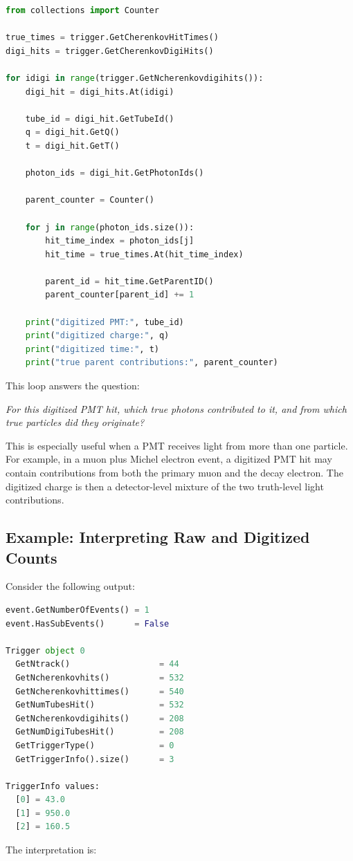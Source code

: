 \documentclass{article}
\numberwithin{table}{subsection}
\numberwithin{figure}{subsection}
\numberwithin{equation}{subsection}
\numberwithin{footnote}{subsection}
\begin{document}
\begin{lstlisting}[language=python]
from collections import Counter

true_times = trigger.GetCherenkovHitTimes()
digi_hits = trigger.GetCherenkovDigiHits()

for idigi in range(trigger.GetNcherenkovdigihits()):
    digi_hit = digi_hits.At(idigi)

    tube_id = digi_hit.GetTubeId()
    q = digi_hit.GetQ()
    t = digi_hit.GetT()

    photon_ids = digi_hit.GetPhotonIds()

    parent_counter = Counter()

    for j in range(photon_ids.size()):
        hit_time_index = photon_ids[j]
        hit_time = true_times.At(hit_time_index)

        parent_id = hit_time.GetParentID()
        parent_counter[parent_id] += 1

    print("digitized PMT:", tube_id)
    print("digitized charge:", q)
    print("digitized time:", t)
    print("true parent contributions:", parent_counter)
\end{lstlisting}
This loop answers the question:

\begin{center}
\emph{For this digitized PMT hit, which true photons contributed to it, and from
which true particles did they originate?}
\end{center}
This is especially useful when a PMT receives light from more than one particle.
For example, in a muon plus Michel electron event, a digitized PMT hit may
contain contributions from both the primary muon and the decay electron. The
digitized charge is then a detector-level mixture of the two truth-level light
contributions.

\subsection{Example: Interpreting Raw and Digitized Counts}

Consider the following output:

\begin{lstlisting}[language=python]
event.GetNumberOfEvents() = 1
event.HasSubEvents()      = False

Trigger object 0
  GetNtrack()                  = 44
  GetNcherenkovhits()          = 532
  GetNcherenkovhittimes()      = 540
  GetNumTubesHit()             = 532
  GetNcherenkovdigihits()      = 208
  GetNumDigiTubesHit()         = 208
  GetTriggerType()             = 0
  GetTriggerInfo().size()      = 3

TriggerInfo values:
  [0] = 43.0
  [1] = 950.0
  [2] = 160.5
\end{lstlisting}
The interpretation is:
\end{document}
